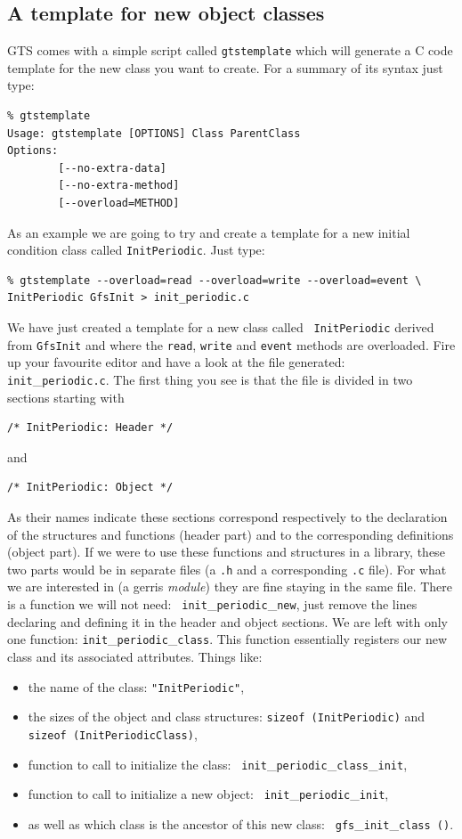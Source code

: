 \documentclass[a4paper]{article}
\begin{document}
\subsection{A template for new object classes}

{\sc GTS} comes with a simple script called {\tt gtstemplate} which will
generate a C code template for the new class you want to create. For a 
summary of its syntax just type:
\begin{verbatim}
% gtstemplate
Usage: gtstemplate [OPTIONS] Class ParentClass
Options:
        [--no-extra-data]
        [--no-extra-method]
        [--overload=METHOD]
\end{verbatim}
As an example we are going to try and create a template for a new
initial condition class called {\tt InitPeriodic}. Just type:
\begin{verbatim}
% gtstemplate --overload=read --overload=write --overload=event \
InitPeriodic GfsInit > init_periodic.c
\end{verbatim}
We have just created a template for a new class called {\tt
InitPeriodic} derived from {\tt GfsInit} and where the {\tt read},
{\tt write} and {\tt event} methods are overloaded. Fire up your
favourite editor and have a look at the file generated: {\tt
init}\_{\tt periodic.c}. The first thing you see is that the file is divided
in two sections starting with
\begin{verbatim}
/* InitPeriodic: Header */
\end{verbatim}
and
\begin{verbatim}
/* InitPeriodic: Object */
\end{verbatim}
As their names indicate these sections correspond respectively to the
declaration of the structures and functions (header part) and to the
corresponding definitions (object part). If we were to use these
functions and structures in a library, these two parts would be in
separate files (a {\tt .h} and a corresponding {\tt .c} file). For
what we are interested in (a gerris {\em module}) they are fine
staying in the same file. There is a function we will not need: {\tt
init}\_{\tt periodic}\_{\tt new}, just remove the lines declaring and
defining it in the header and object sections. We are left with only
one function: {\tt init}\_{\tt periodic}\_{\tt class}. This function
essentially registers our new class and its associated
attributes. Things like:
\begin{itemize}
\item the name of the class: {\tt "InitPeriodic"},
\item the sizes of the object and class structures: 
{\tt sizeof (InitPeriodic)} and {\tt sizeof (InitPeriodicClass)},
\item function to call to initialize the class: {\tt
init}\_{\tt periodic}\_{\tt class}\_{\tt init},
\item function to call to initialize a new object: {\tt
init}\_{\tt periodic}\_{\tt init},
\item as well as which class is the ancestor of this new class: {\tt
gfs}\_{\tt init}\_{\tt class ()}.
\end{itemize}
\end{document}
